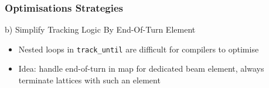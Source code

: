 \documentclass{beamer}
\begin{document}
\begin{frame}
    \frametitle{Optimisations Strategies}
    {b) Simplify Tracking Logic By End-Of-Turn Element}\\[0.4em]
    \begin{itemize}
        \item Nested loops in \texttt{track\_until} are difficult for compilers to optimise
        \item {\color{MyDarkBlue}Idea:} handle end-of-turn in map for dedicated beam element, always terminate lattices with such an element
    \end{itemize}
\begin{columns}
\begin{column}{0.6\textwidth}
\begin{algorithm}[H]
\small
\begin{algorithmic}
    \EndWhile
\EndFor
\EndProcedure
\end{algorithmic}
\end{algorithm}
\end{column}
\begin{column}{0.4\textwidth}

\end{column}
\end{columns}
\end{frame}
\end{document}

